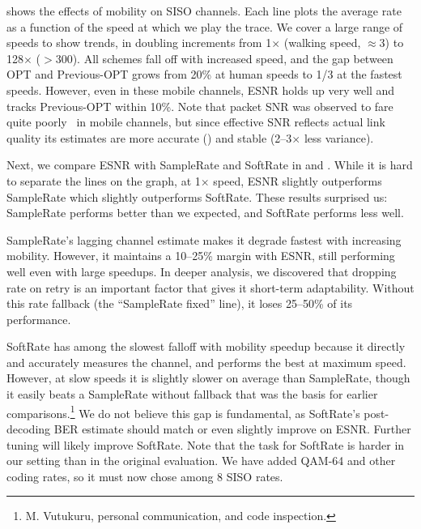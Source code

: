  shows the effects of mobility on SISO channels. Each line plots the average rate as a function of the speed at which we play the trace. We cover a large range of speeds to show trends, in doubling increments from 1$\times$ (walking speed, $\approx$3\mph) to 128$\times$ ($>$300\mph). All schemes fall off with increased speed, and the gap between OPT and Previous-OPT grows from 20\% at human speeds to 1/3 at the fastest speeds. However, even in these mobile channels, ESNR holds up very well and tracks Previous-OPT within 10\%.
Note that packet SNR was observed to fare quite poorly~\cite{Vutukuru_SoftRate} in mobile channels, but since effective SNR reflects actual link quality its estimates are more accurate () and stable (2--3$\times$ less variance).

Next, we compare ESNR with SampleRate and SoftRate %
in  and . While it is hard to separate the lines on the graph, at 1$\times$ speed, ESNR slightly outperforms SampleRate which slightly outperforms SoftRate. These results surprised us: SampleRate performs better than we expected, and SoftRate performs less well. 

SampleRate's lagging channel estimate makes it degrade fastest with increasing mobility. However, it maintains a 10--25\% margin with ESNR, still performing well even with large speedups. In deeper analysis, we discovered that dropping rate on retry is an important factor that gives it short-term adaptability. Without this rate fallback (the ``SampleRate fixed'' line), it loses 25--50\% of its performance.

SoftRate has among the slowest falloff with mobility speedup because it directly and accurately measures the channel, and performs the best at maximum speed. However, at slow speeds it is slightly slower on average than SampleRate, though it easily beats a SampleRate without fallback that was the basis for earlier comparisons.\footnote{M. Vutukuru, personal communication, and code inspection.}
We do not believe this gap is fundamental, as SoftRate's post-decoding BER estimate should match or even slightly improve on ESNR\@. Further tuning will likely improve SoftRate. Note that the task for SoftRate is harder in our setting than in the original evaluation. We have added QAM-64 and other coding rates, so it must now chose among 8 SISO rates.


